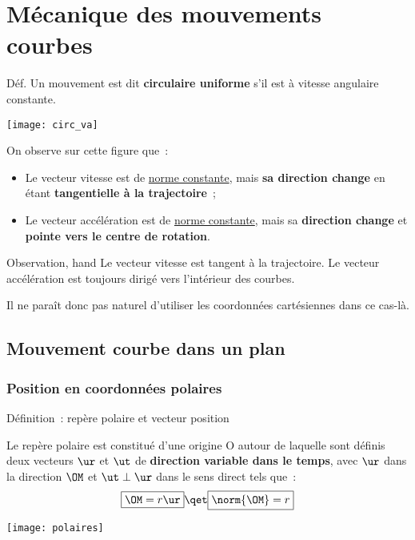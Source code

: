 \documentclass[../main/main.tex]{subfiles}
\begin{document}
\setcounter{chapter}{2}

\chapter{M\'ecanique des mouvements courbes}

\begin{rdefi}{Déf.}
    Un mouvement est dit \textbf{circulaire uniforme} s'il est à vitesse
    angulaire constante.
\end{rdefi}

\begin{center}
    \texttt{[image: circ\_va]}
\end{center}

On observe sur cette figure que~: \bigbreak
\begin{itemize}
    \item Le vecteur vitesse est de \underline{norme constante}, mais \textbf{sa
        direction change} en étant \textbf{tangentielle à la trajectoire}~;
    \item Le vecteur accélération est de \underline{norme constante}, mais sa
        \textbf{direction change} et \textbf{pointe vers le centre de rotation}.
\end{itemize}

\begin{tror}{Observation, hand}
    \centering
    Le vecteur vitesse est tangent à la trajectoire. Le vecteur accélération est
    toujours dirigé vers l’intérieur des courbes.
\end{tror}

Il ne paraît donc pas naturel d'utiliser les coordonnées cartésiennes dans ce
cas-là.

\section{Mouvement courbe dans un plan}
\subsection{Position en coordonnées polaires}

\begin{tdefi}{Définition~: repère polaire et vecteur position}
    \begin{minipage}{0.60\linewidth}
        Le repère polaire est constitué d'une origine O autour de laquelle sont
        définis deux vecteurs $\ur$ et $\ut$ de \textbf{direction
        variable dans le temps}, avec $\ur$ dans la direction $\OM$ et $\ut
        \perp \ur$ dans le sens direct tels que~:
        \[\boxed{\OM = r\ur}
        \qet
        \boxed{\norm{\OM} = r}\]
    \end{minipage}
    \hfill
    \begin{minipage}{0.35\linewidth}
        \begin{center}
            \texttt{[image: polaires]}
        \end{center}
    \end{minipage}
\end{tdefi}
\end{document}
